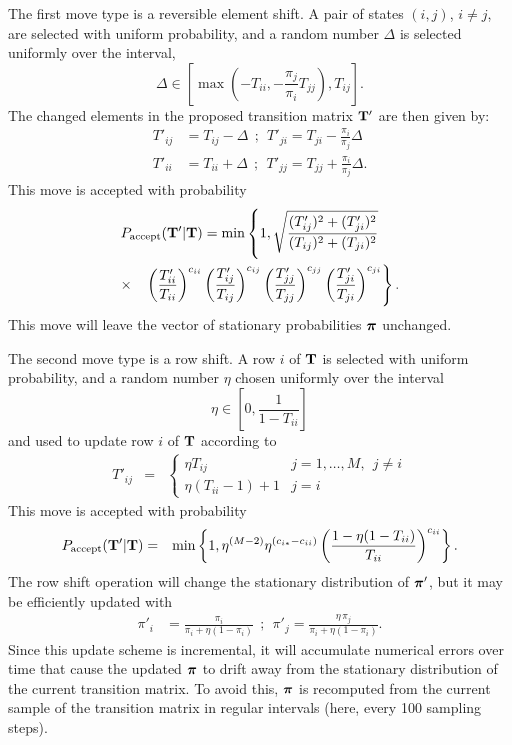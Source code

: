 \documentclass[aps,pre,twocolumn,superscriptaddress,nofootinbib,longbibliography]{revtex4-1}
\newcommand{\bfv}[1]{{\mbox{\boldmath{$#1$}}}}
\newcommand{\bfm}[1]{{\bf #1}}
\begin{document}
{The first move type is a reversible element shift.
A pair of states $(i,j)$, $i \ne j$, are selected with uniform probability, and a random number $\Delta$ is selected uniformly over the interval,
\begin{equation*}
\Delta \in[\max(-T_{ii},-\frac{\pi_{j}}{\pi_{i}}T_{jj}),T_{ij}] .
\end{equation*}
The changed elements in the proposed transition matrix $\bfm{T}'$ are then given by:
\begin{align*}
T'_{ij} & =T_{ij}-\Delta \:\: ; \:\: T'_{ji}  =T_{ji}-\frac{\pi_{i}}{\pi_{j}}\Delta \\
T'_{ii} & =T_{ii}+\Delta \:\: ; \:\: T'_{jj}  =T_{jj}+\frac{\pi_{i}}{\pi_{j}}\Delta  .
\end{align*}
This move is accepted with probability
\begin{eqnarray}
\lefteqn{P_\mathrm{accept}(\bfm{T}' | \bfm{T} ) = \mathrm{min}\left\{1, \sqrt{\frac{(T'_{ij})^{2}+(T'_{ji})^{2}}{(T_{ij})^{2}+(T_{ji})^{2}}} \right. }\\
&\times& \left. \left(\frac{T'_{ii}}{T_{ii}}\right)^{c_{ii}}\left(\frac{T'_{ij}}{T_{ij}}\right)^{c_{ij}} \left(\frac{T'_{jj}}{T_{jj}}\right)^{c_{jj}}\left(\frac{T'_{ji}}{T_{ji}}\right)^{c_{ji}} \right\} . \nonumber
\end{eqnarray}
This move will leave the vector of stationary probabilities $\bfv{\pi}$ unchanged.

The second move type is a row shift.
A row $i$ of $\bfm{T}$ is selected with uniform probability, and a random number $\eta$ chosen uniformly over the interval 
\begin{equation*}
\eta\in\left[0,\frac{1}{1-T_{ii}}\right]
\end{equation*}
and used to update row $i$ of $\bfm{T}$ according to
\begin{eqnarray}
T'_{ij} &=& \begin{cases}
\eta T_{ij} & j = 1, \ldots, M, \:\: j \ne i\\
\eta (T_{ii} - 1) + 1 & j = i
\end{cases}
\end{eqnarray}
This move is accepted with probability
\begin{eqnarray}
P_\mathrm{accept}(\bfm{T}' | \bfm{T}) &=& \mathrm{min} \left\{1, \eta^{(M-2)} \eta^{(c_{i*}-c_{ii})}\left(\frac{1-\eta(1-T_{ii})}{T_{ii}}\right)^{c_{ii}} \right\} . \nonumber\\
\end{eqnarray}
The row shift operation will change the stationary distribution of $\bfv{\pi}'$, but it may be efficiently updated with
\begin{align*}
\pi'_{i} & =\frac{\pi_{i}}{\pi_{i}+\eta(1-\pi_{i})} \:\: ; \:\: \pi'_{j} =\frac{\eta \, \pi_{j}}{\pi_{i}+\eta(1-\pi_{i})}.
\end{align*}
Since this update scheme is incremental, it will accumulate numerical errors over time that cause the updated $\bfv{\pi}$ to drift away from the stationary distribution of the current transition matrix. 
To avoid this, $\bfv{\pi}$ is recomputed from the current sample of the transition matrix in regular intervals (here, every 100 sampling steps).

}
\end{document}
